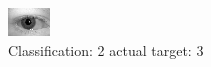 \begin{figure}[h!]
\begin{center}
\includegraphics[width=0.60\columnwidth]{figures/ID638_class_2_target_3.png}
\end{center}
\caption{ Classification: 2 actual target: 3}
\label{fig:ID638_class_2_target_3}
\end{figure}
